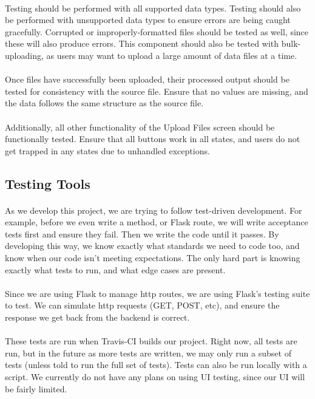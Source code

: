 \documentclass[12pt,oneside,letterpaper]{article}
\begin{document}
\paragraph{} Testing should be performed with all supported data types. Testing should also be performed with unsupported data types to ensure errors are being caught gracefully. Corrupted or improperly-formatted files should be tested as well, since these will also produce errors. This component should also be tested with bulk-uploading, as users may want to upload a large amount of data files at a time.
\paragraph{} Once files have successfully been uploaded, their processed output should be tested for consistency with the source file. Ensure that no values are missing, and the data follows the same structure as the source file.
\paragraph{} Additionally, all other functionality of the Upload Files screen should be functionally tested. Ensure that all buttons work in all states, and users do not get trapped in any states due to unhandled exceptions.

\subsection{Testing Tools}
\paragraph{} As we develop this project, we are trying to follow test-driven development. For example, before we even write a method, or Flask route, we will write acceptance tests first and ensure they fail. Then we write the code until it passes. By developing this way, we know exactly what standards we need to code too, and know when our code isn't meeting expectations. The only hard part is knowing exactly what tests to run, and what edge cases are present.
\paragraph{} Since we are using Flask to manage http routes, we are using Flask's testing suite to test. We can simulate http requests (GET, POST, etc), and ensure the response we get back from the backend is correct.
\paragraph{} These tests are run when Travis-CI builds our project. Right now, all tests are run, but in the future as more tests are written, we may only run a subset of tests (unless told to run the full set of tests). Tests can also be run locally with a script. We currently do not have any plans on using UI testing, since our UI will be fairly limited.
\end{document}
